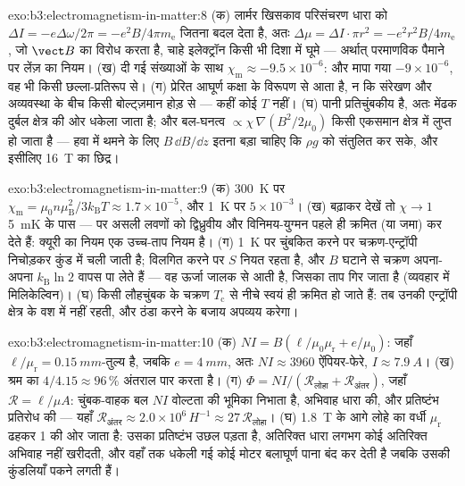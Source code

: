 \begin{solution}{exo:b3:electromagnetism-in-matter:8}
(क) लार्मर खिसकाव परिसंचरण धारा को $\Delta I
= -e\Delta\omega/2\pi = -e^2B/4\pi m_{\text{e}}$ जितना बदल देता है,
अतः $\Delta\mu = \Delta I\cdot\pi r^2 = -e^2r^2B/4m_{\text{e}}$,
जो $\vect B$ का विरोध करता है, चाहे इलेक्ट्रॉन किसी भी दिशा में घूमे
--- अर्थात् परमाणविक पैमाने पर लेंज़ का नियम। (ख) दी गई संख्याओं के
साथ $\chi_{\text{m}} \approx -9.5\times10^{-6}$: और मापा गया
$-9\times10^{-6}$, वह भी किसी छल्ला-प्रतिरूप से। (ग) प्रेरित आघूर्ण
कक्षा के विरूपण से आता है, न कि संरेखण और अव्यवस्था के बीच किसी
बोल्ट्ज़मान होड़ से --- कहीं कोई $T$ नहीं। (घ) पानी
प्रतिचुंबकीय है, अतः मेंढक दुर्बल क्षेत्र की ओर धकेला जाता है; और
बल-घनत्व $\propto \chi\,\nabla(B^2/2\mu_0)$ किसी एकसमान क्षेत्र में
लुप्त हो जाता है --- हवा में थमने के लिए $B\,\dd B/\dd z$ इतना बड़ा
चाहिए कि $\rho g$ को संतुलित कर सके, और इसीलिए \qty{16}{T} का छिद्र।
\end{solution}

\begin{solution}{exo:b3:electromagnetism-in-matter:9}
(क) \qty{300}{K} पर $\chi_{\text{m}} = \mu_0n\mu_{\text{B}}^2/3k_{\text{B}}T
\approx 1.7\times10^{-5}$, और \qty{1}{K} पर $5\times10^{-3}$।
(ख) बढ़ाकर देखें तो $\chi \to 1$ \qty{5}{mK} के पास ---
पर असली लवणों को द्विध्रुवीय और विनिमय-युग्मन पहले ही क्रमित (या जमा)
कर देते हैं: क्यूरी का नियम एक उच्च-ताप नियम है। (ग)
\qty{1}{K} पर चुंबकित करने पर चक्रण-एन्ट्रॉपी निचोड़कर कुंड में चली
जाती है; विलगित करने पर $S$ नियत रहता है, और $B$ घटाने से चक्रण
अपना-अपना $k_{\text{B}}\ln 2$ वापस पा लेते हैं --- वह ऊर्जा
जालक से आती है, जिसका ताप गिर जाता है (व्यवहार में मिलिकेल्विन)। (घ)
किसी लौहचुंबक के चक्रण $T_{\text{c}}$ से नीचे स्वयं ही क्रमित हो जाते
हैं: तब उनकी एन्ट्रॉपी क्षेत्र के वश में नहीं रहती, और 
ठंडा करने के बजाय अपव्यय करेगा।
\end{solution}

\begin{solution}{exo:b3:electromagnetism-in-matter:10}
(क) $NI = B(\ell/\mu_0\mu_{\text{r}} + e/\mu_0)$: जहाँ
$\ell/\mu_{\text{r}} = \qty{0.15}{mm}$-तुल्य है, जबकि $e =
\qty{4}{mm}$, अतः $NI \approx 3960$ ऐंपियर-फेरे, $I \approx
\qty{7.9}{A}$। (ख) श्रम का $4/4.15 \approx 96\,\%$ अंतराल पार
करता है। (ग) $\Phi = NI/(\mathcal R_{\text{लोहा}} +
\mathcal R_{\text{अंतर}})$, जहाँ $\mathcal R = \ell/\mu A$:
चुंबक-वाहक बल $NI$ वोल्टता की भूमिका निभाता है, अभिवाह धारा की,
और प्रतिष्टंभ प्रतिरोध की --- यहाँ $\mathcal R_{\text{अंतर}}
\approx 2.0\times10^{6}\,\unit{H^{-1}} \approx
27\,\mathcal R_{\text{लोहा}}$। (घ) \qty{1.8}{T} के आगे लोहे का
वर्धी $\mu_{\text{r}}$ ढहकर 1 की ओर जाता है: उसका प्रतिष्टंभ
उछल पड़ता है, अतिरिक्त धारा लगभग कोई अतिरिक्त अभिवाह नहीं खरीदती, और
वहाँ तक धकेली गई कोई मोटर बलाघूर्ण पाना बंद कर देती है जबकि उसकी
कुंडलियाँ पकने लगती हैं।
\end{solution}

